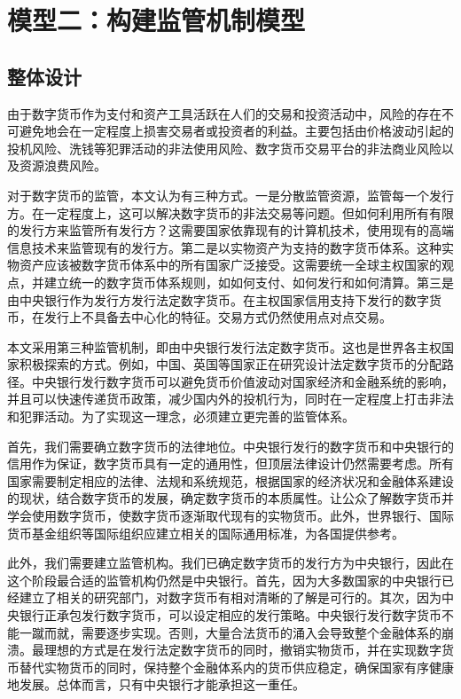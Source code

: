 \documentclass[withoutpreface,bwprint]{cumcmthesis} %
\begin{document}
\section{模型二：构建监管机制模型}


\subsection{整体设计}
由于数字货币作为支付和资产工具活跃在人们的交易和投资活动中，风险的存在不可避免地会在一定程度上损害交易者或投资者的利益。主要包括由价格波动引起的投机风险、洗钱等犯罪活动的非法使用风险、数字货币交易平台的非法商业风险以及资源浪费风险\cite{yang2018risks}。

对于数字货币的监管，本文认为有三种方式。一是分散监管资源，监管每一个发行方。在一定程度上，这可以解决数字货币的非法交易等问题。但如何利用所有有限的发行方来监管所有发行方？这需要国家依靠现有的计算机技术，使用现有的高端信息技术来监管现有的发行方。第二是以实物资产为支持的数字货币体系。这种实物资产应该被数字货币体系中的所有国家广泛接受。这需要统一全球主权国家的观点，并建立统一的数字货币体系规则，如如何支付、如何发行和如何清算。第三是由中央银行作为发行方发行法定数字货币。在主权国家信用支持下发行的数字货币，在发行上不具备去中心化的特征。交易方式仍然使用点对点交易。

本文采用第三种监管机制，即由中央银行发行法定数字货币。这也是世界各主权国家积极探索的方式。例如，中国、英国等国家正在研究设计法定数字货币的分配路径。中央银行发行数字货币可以避免货币价值波动对国家经济和金融系统的影响，并且可以快速传递货币政策，减少国内外的投机行为，同时在一定程度上打击非法和犯罪活动。为了实现这一理念，必须建立更完善的监管体系。

首先，我们需要确立数字货币的法律地位。中央银行发行的数字货币和中央银行的信用作为保证，数字货币具有一定的通用性，但顶层法律设计仍然需要考虑。所有国家需要制定相应的法律、法规和系统规范，根据国家的经济状况和金融体系建设的现状，结合数字货币的发展，确定数字货币的本质属性。让公众了解数字货币并学会使用数字货币，使数字货币逐渐取代现有的实物货币。此外，世界银行、国际货币基金组织等国际组织应建立相关的国际通用标准，为各国提供参考。

此外，我们需要建立监管机构。我们已确定数字货币的发行方为中央银行，因此在这个阶段最合适的监管机构仍然是中央银行。首先，因为大多数国家的中央银行已经建立了相关的研究部门，对数字货币有相对清晰的了解是可行的。其次，因为中央银行正承包发行数字货币，可以设定相应的发行策略。中央银行发行数字货币不能一蹴而就，需要逐步实现。否则，大量合法货币的涌入会导致整个金融体系的崩溃。最理想的方式是在发行法定数字货币的同时，撤销实物货币，并在实现数字货币替代实物货币的同时，保持整个金融体系内的货币供应稳定，确保国家有序健康地发展。总体而言，只有中央银行才能承担这一重任。
\end{document}
